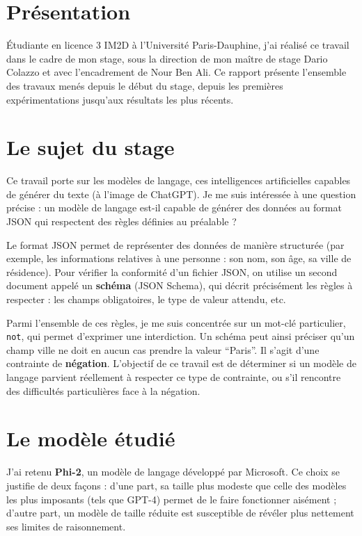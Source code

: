 \documentclass[11pt,a4paper]{article}
\begin{document}
\section*{Présentation}

Étudiante en licence 3 IM2D à l'Université Paris-Dauphine, j'ai réalisé ce travail dans le cadre de mon stage, sous la direction de mon maître de stage Dario Colazzo et avec l'encadrement de Nour Ben Ali. Ce rapport présente l'ensemble des travaux menés depuis le début du stage, depuis les premières expérimentations jusqu'aux résultats les plus récents.

\section{Le sujet du stage}

Ce travail porte sur les modèles de langage, ces intelligences artificielles capables de générer du texte (à l'image de ChatGPT). Je me suis intéressée à une question précise : un modèle de langage est-il capable de générer des données au format JSON qui respectent des règles définies au préalable ?

Le format JSON permet de représenter des données de manière structurée (par exemple, les informations relatives à une personne : son nom, son âge, sa ville de résidence). Pour vérifier la conformité d'un fichier JSON, on utilise un second document appelé un \textbf{schéma} (JSON Schema), qui décrit précisément les règles à respecter : les champs obligatoires, le type de valeur attendu, etc.

Parmi l'ensemble de ces règles, je me suis concentrée sur un mot-clé particulier, \texttt{not}, qui permet d'exprimer une interdiction. Un schéma peut ainsi préciser qu'un champ ville ne doit en aucun cas prendre la valeur ``Paris''. Il s'agit d'une contrainte de \textbf{négation}. L'objectif de ce travail est de déterminer si un modèle de langage parvient réellement à respecter ce type de contrainte, ou s'il rencontre des difficultés particulières face à la négation.

\section{Le modèle étudié}

J'ai retenu \textbf{Phi-2}, un modèle de langage développé par Microsoft. Ce choix se justifie de deux façons : d'une part, sa taille plus modeste que celle des modèles les plus imposants (tels que GPT-4) permet de le faire fonctionner aisément ; d'autre part, un modèle de taille réduite est susceptible de révéler plus nettement ses limites de raisonnement.
\end{document}
